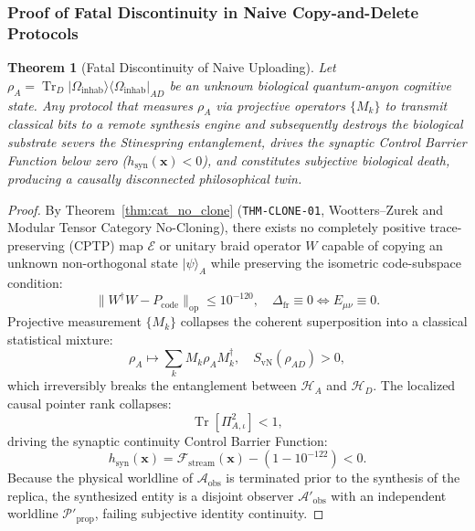 \documentclass[11pt,onecolumn]{article}
\newtheorem{theorem}{Theorem}
\DeclareMathOperator{\Tr}{Tr}
\begin{document}
\subsubsection{Proof of Fatal Discontinuity in Naive Copy-and-Delete Protocols}
\begin{theorem}[Fatal Discontinuity of Naive Uploading]
Let $\rho_A = \Tr_D |\Omega_{\text{inhab}}\rangle\langle\Omega_{\text{inhab}}|_{AD}$ be an unknown biological quantum-anyon cognitive state. Any protocol that measures $\rho_A$ via projective operators $\{M_k\}$ to transmit classical bits to a remote synthesis engine and subsequently destroys the biological substrate severs the Stinespring entanglement, drives the synaptic Control Barrier Function below zero ($h_{\text{syn}}(\mathbf{x}) < 0$), and constitutes subjective biological death, producing a causally disconnected philosophical twin.
\end{theorem}

\begin{proof}
By Theorem~\ref{thm:cat_no_clone} (\texttt{THM-CLONE-01}, Wootters--Zurek and Modular Tensor Category No-Cloning), there exists no completely positive trace-preserving (CPTP) map $\mathcal{E}$ or unitary braid operator $W$ capable of copying an unknown non-orthogonal state $|\psi\rangle_A$ while preserving the isometric code-subspace condition:
\begin{equation}
\|W^\dagger W - P_{\text{code}}\|_{\text{op}} \le 10^{-120}, \quad \Delta_{\text{fr}} \equiv 0 \iff E_{\mu\nu} \equiv 0.
\end{equation}
Projective measurement $\{M_k\}$ collapses the coherent superposition into a classical statistical mixture:
\begin{equation}
\rho_A \mapsto \sum_k M_k \rho_A M_k^\dagger, \quad S_{\text{vN}}(\rho_{AD}) > 0,
\end{equation}
which irreversibly breaks the entanglement between $\mathcal{H}_A$ and $\mathcal{H}_D$. The localized causal pointer rank collapses:
\begin{equation}
\Tr\left[ \Pi_{A,\iota}^2 \right] < 1,
\end{equation}
driving the synaptic continuity Control Barrier Function:
\begin{equation}
h_{\text{syn}}(\mathbf{x}) = \mathcal{F}_{\text{stream}}(\mathbf{x}) - \left(1 - 10^{-122}\right) < 0.
\end{equation}
Because the physical worldline of $\mathcal{A}_{\text{obs}}$ is terminated prior to the synthesis of the replica, the synthesized entity is a disjoint observer $\mathcal{A}'_{\text{obs}}$ with an independent worldline $\mathcal{P}'_{\text{prop}}$, failing subjective identity continuity.
\end{proof}
\end{document}
